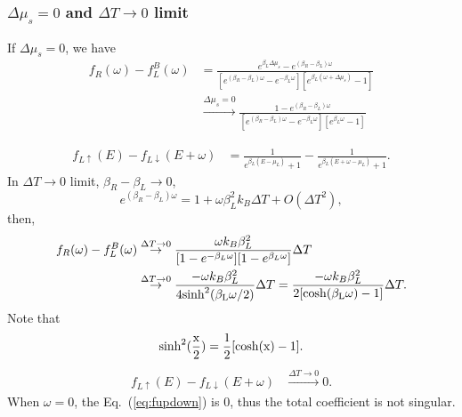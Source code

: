 \documentclass[aps,prb,superscriptaddress]{revtex4-2}
\begin{document}
\subsubsection{$\Delta\mu_s=0$ and $\Delta T\to 0$ limit}
If $\Delta\mu_{s} = 0$, we have
\begin{equation}
\begin{split}
f_{R}(\omega)-f_{L}^{B}(\omega) & =\frac{e^{\beta_{L}\Delta\mu_{s}} - e^{(\beta_{R}-\beta_{L})\omega}}{[e^{(\beta_{R}-\beta_{L})\omega}-e^{-\beta_{L}\omega}][e^{\beta_{L}(\omega+\Delta\mu_{s})}-1]} \\
&\stackrel{\Delta \mu_s= 0}{\rightarrow} \frac{1-e^{(\beta_{R}-\beta_{L})\omega}}{[e^{(\beta_{R}-\beta_{L})\omega}-e^{-\beta_{L}\omega}][e^{\beta_{L}\omega}-1]}
\end{split}
\end{equation}

\begin{equation}\label{eq:fupdown}
\begin{split}
f_{L\uparrow}(E)-f_{L\downarrow}(E+\omega) &= \frac{1}{e^{\beta_{L}(E-\mu_{L})}+1} - \frac{1}{e^{\beta_{L}(E+\omega-\mu_{L})}+1}.
\end{split}
\end{equation}
In $\Delta T\to 0$ limit, $\beta_{R}-\beta_{L} \to 0$,
\begin{equation}
e^{(\beta_{R}-\beta_{L})\omega} = 1 + \omega\beta_{L}^{2} k_{B}\Delta T + O(\Delta T^{2}),
\end{equation}
then,
\begin{equation}
\begin{split}
f_{R}(\omega)-f_{L}^{B}(\omega) &\stackrel{\Delta T\to 0}{\rightarrow}  \frac{\omega k_{B}\beta_{L}^{2} } {[ 1 - e^{-\beta_{L}\omega}] [1-e^{\beta_{L} \omega}]}\Delta T \\
& \stackrel{\Delta T\to 0}{\rightarrow} \frac{-\omega k_{B}\beta_{L}^{2}} {4\rm{sinh}^2(\beta_{L}\omega/2)}\Delta T  = \frac{-\omega k_{B}\beta_{L}^{2}} {2[\rm{cosh}(\beta_{L}\omega)-1]}\Delta T.
\end{split}
\end{equation}
Note that
\[
\rm{sinh}^2(\frac{x}{2}) = \frac{1}{2}[\rm{cosh}(x)-1].
\]
\begin{equation}\label{eq:fupdown}
\begin{split}
f_{L\uparrow}(E)-f_{L\downarrow}(E+\omega) & \stackrel{\Delta T\to 0}{\rightarrow} 0.
\end{split}
\end{equation}
When $\omega=0$, the Eq.~(\ref{eq:fupdown}) is 0, thus the total coefficient is not singular. 
\end{document}
